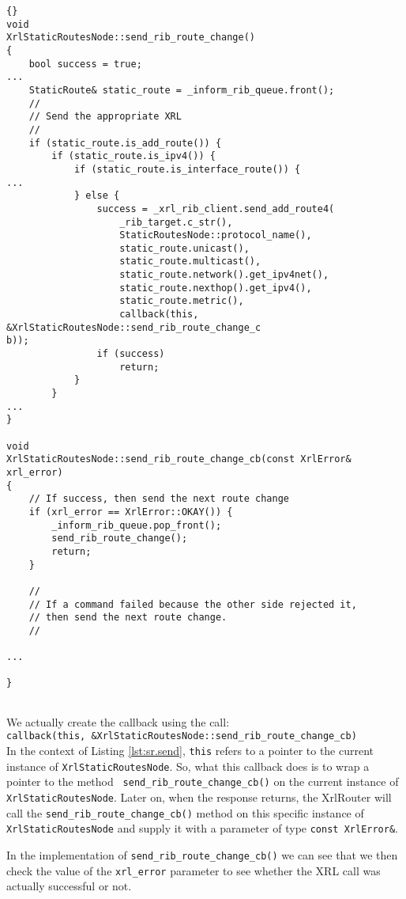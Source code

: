 \documentclass[11pt]{article}
\newcommand{\stt}{\tt\small}
\begin{document}
\begin{lstlisting}[caption={Extracts from {\stt xorp/static\_routes/xrl\_static\_routes\_node.cc} %
                                     \label{lst:sr.send} } ]{}
void
XrlStaticRoutesNode::send_rib_route_change()
{
    bool success = true;
...
    StaticRoute& static_route = _inform_rib_queue.front();
    //
    // Send the appropriate XRL
    //
    if (static_route.is_add_route()) {
        if (static_route.is_ipv4()) {
            if (static_route.is_interface_route()) {
...
            } else {
                success = _xrl_rib_client.send_add_route4(
                    _rib_target.c_str(),
                    StaticRoutesNode::protocol_name(),
                    static_route.unicast(),
                    static_route.multicast(),
                    static_route.network().get_ipv4net(),
                    static_route.nexthop().get_ipv4(),
                    static_route.metric(),
                    callback(this, &XrlStaticRoutesNode::send_rib_route_change_c
b));
                if (success)
                    return;
            }
        }
...
}

void
XrlStaticRoutesNode::send_rib_route_change_cb(const XrlError& xrl_error)
{
    // If success, then send the next route change
    if (xrl_error == XrlError::OKAY()) {
        _inform_rib_queue.pop_front();
        send_rib_route_change();
        return;
    }

    //
    // If a command failed because the other side rejected it,
    // then send the next route change.
    //

...

}


\end{lstlisting}
\newpage
\noindent We actually create the callback using the call:\\ {\stt callback(this,
\&XrlStaticRoutesNode::send\_rib\_route\_change\_cb)}\\ In the context of
Listing \ref{lst:sr.send}, {\stt this} refers to a pointer to the
current instance of {\stt XrlStaticRoutesNode}.  So, what this
callback does is to wrap a pointer to the method {\stt
send\_rib\_route\_change\_cb()} on the current instance of {\stt
XrlStaticRoutesNode}.  Later on, when the response returns, the
XrlRouter will call the {\stt send\_rib\_route\_change\_cb()} method on
this specific instance of {\stt XrlStaticRoutesNode} and supply it
with a parameter of type {\stt const XrlError\&}.

In the implementation of {\stt send\_rib\_route\_change\_cb()} we can see
that we then check the value of the {\stt xrl\_error} parameter to see
whether the XRL call was actually successful or not.
\end{document}
